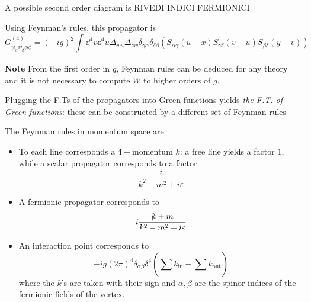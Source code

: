 A possible second order diagram is RIVEDI INDICI FERMIONICI\\

Using Feynman's rules, this propagator is
\[
    G^{(4)}_{\psi_\alpha\bar\psi_\beta\phi\phi} = 
    (-ig)^2\int_{}^{} \dd^4v\dd^4u \Delta_{wu}\Delta_{zw}\delta_{\gamma\alpha}
    \delta_{\delta\beta}\left(
        S_{\alpha\gamma}(u-x)S_{\gamma\delta}(v-u)S_{\beta\delta}(y-v)
    \right)
\]

\textbf{Note} From the first order in $g$, Feynman rules can be deduced for any
theory and it is not necessary to compute $W$ to higher orders of $g$.

Plugging the F.Ts of the propagators into Green functions yields
\textit{the F.T. of Green functions}: these can be constructed by a different
set of Feynman rules 

The Feynman rules in momentum space are
\begin{itemize}
    \item To each line corresponds a $4-$momentum $k$: a free line
        yields a factor $1$, while a scalar propagator corresponds to a factor 
        \[
            \frac{i}{k^2-m^2+i\varepsilon}
        \]
    \item A fermionic propagator corresponds to
        \[
            i\frac{\slashed{k}+m}{k^2-m^2+i\varepsilon}
        \]
    \item An interaction point corresponds to
        \[
            -ig(2\pi)^4\delta_{\alpha\beta}\delta^4\left(\sum_{}^{}k_\text{in}
            -\sum_{}^{}k_\text{out}\right)
        \]
        where the $k$'s are taken with their sign and $\alpha,\beta$ are the
        spinor indices of the fermionic fields of the vertex.
\end{itemize}

